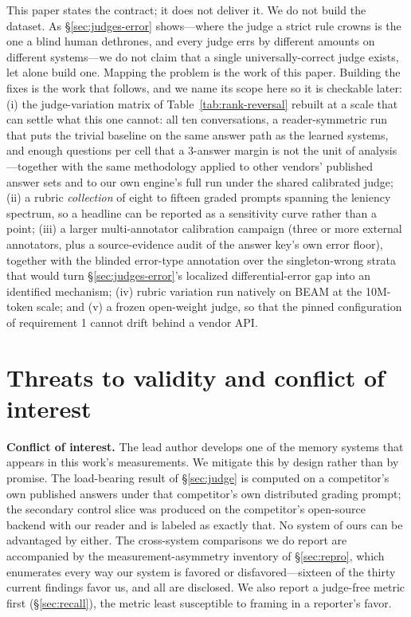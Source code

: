 \documentclass[11pt]{article}
\begin{document}
This paper states the contract; it does not deliver it. We do not build the dataset. As \S\ref{sec:judges-error} shows---where the judge a strict rule crowns is the one a blind human dethrones, and every judge errs by different amounts on different systems---we do not claim that a single universally-correct judge exists, let alone build one. Mapping the problem is the work of this paper. Building the fixes is the work that follows, and we name its scope here so it is checkable later: (i) the judge-variation matrix of Table~\ref{tab:rank-reversal} rebuilt at a scale that can settle what this one cannot: all ten conversations, a reader-symmetric run that puts the trivial baseline on the same answer path as the learned systems, and enough questions per cell that a 3-answer margin is not the unit of analysis---together with the same methodology applied to other vendors' published answer sets and to our own engine's full run under the shared calibrated judge; (ii) a rubric \emph{collection} of eight to fifteen graded prompts spanning the leniency spectrum, so a headline can be reported as a sensitivity curve rather than a point; (iii) a larger multi-annotator calibration campaign (three or more external annotators, plus a source-evidence audit of the answer key's own error floor), together with the blinded error-type annotation over the singleton-wrong strata that would turn \S\ref{sec:judges-error}'s localized differential-error gap into an identified mechanism; (iv) rubric variation run natively on BEAM at the 10M-token scale; and (v) a frozen open-weight judge, so that the pinned configuration of requirement 1 cannot drift behind a vendor API.

\section{Threats to validity and conflict of interest}\label{sec:threats}

\textbf{Conflict of interest.} The lead author develops one of the memory systems that appears in this work's measurements. We mitigate this by design rather than by promise. The load-bearing result of \S\ref{sec:judge} is computed on a competitor's own published answers under that competitor's own distributed grading prompt; the secondary control slice was produced on the competitor's open-source backend with our reader and is labeled as exactly that. No system of ours can be advantaged by either. The cross-system comparisons we do report are accompanied by the measurement-asymmetry inventory of \S\ref{sec:repro}, which enumerates every way our system is favored or disfavored---sixteen of the thirty current findings favor us, and all are disclosed. We also report a judge-free metric first (\S\ref{sec:recall}), the metric least susceptible to framing in a reporter's favor.
\end{document}
